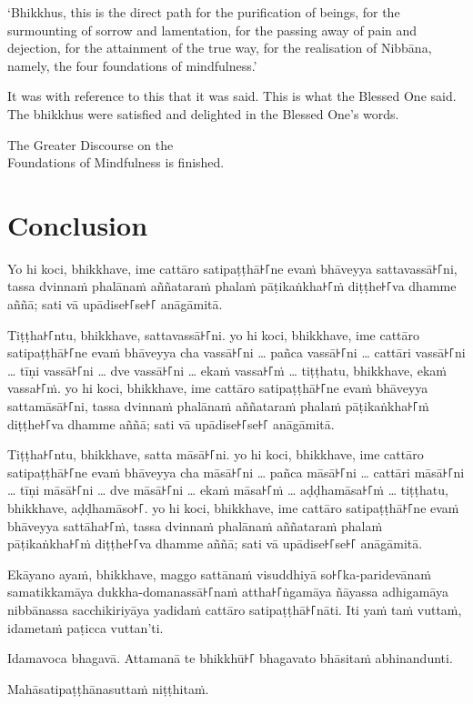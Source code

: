 `Bhikkhus, this is the direct path for the purification of beings, for the
surmounting of sorrow and lamentation, for the passing away of pain and
dejection, for the attainment of the true way, for the realisation of Nibbāna,
namely, the four foundations of mindfulness.'

It was with reference to this that it was said. This is what the Blessed One
said. The bhikkhus were satisfied and delighted in the Blessed One's words.

\bigskip

{\centering\instructionFont\color{instruction}\upshape

  The Greater Discourse on the\\
  Foundations of Mindfulness is finished.

}

\paliPage
\chapter*{Conclusion}

Yo hi koci, bhikkhave, ime cattāro satipaṭṭhā꜔꜒ne evaṁ bhāveyya sattavassā꜔꜒ni,
tassa dvinnaṁ phalānaṁ aññataraṁ phalaṁ pāṭikaṅkha꜔꜒ṁ diṭṭhe꜔꜒va dhamme aññā; sati
vā upādise꜔꜒se꜔꜒ anāgāmitā.

Tiṭṭha꜔꜒ntu, bhikkhave, sattavassā꜔꜒ni. yo hi koci, bhikkhave, ime cattāro
satipaṭṭhā꜔꜒ne evaṁ bhāveyya cha vassā꜔꜒ni \ldots{} pañca vassā꜔꜒ni
\ldots{} cattāri vassā꜔꜒ni \ldots{} tīṇi vassā꜔꜒ni \ldots{} dve vassā꜔꜒ni \ldots{}
ekaṁ vassa꜔꜒ṁ \ldots{} tiṭṭhatu, bhikkhave, ekaṁ vassa꜔꜒ṁ. yo hi koci, bhikkhave,
ime cattāro satipaṭṭhā꜔꜒ne evaṁ bhāveyya sattamāsā꜔꜒ni, tassa dvinnaṁ phalānaṁ
aññataraṁ phalaṁ pāṭikaṅkha꜔꜒ṁ diṭṭhe꜔꜒va dhamme aññā; sati vā upādise꜔꜒se꜔꜒ anāgāmitā.

Tiṭṭha꜔꜒ntu, bhikkhave, satta māsā꜔꜒ni. yo hi koci, bhikkhave, ime cattāro
satipaṭṭhā꜔꜒ne evaṁ bhāveyya cha māsā꜔꜒ni \ldots{} pañca māsā꜔꜒ni \ldots{}
cattāri māsā꜔꜒ni \ldots{} tīṇi māsā꜔꜒ni \ldots{} dve māsā꜔꜒ni \ldots{} ekaṁ māsa꜔꜒ṁ
\ldots{} aḍḍhamāsa꜔꜒ṁ \ldots{} tiṭṭhatu, bhikkhave, aḍḍhamāso꜔꜒. yo hi koci,
bhikkhave, ime cattāro satipaṭṭhā꜔꜒ne evaṁ bhāveyya sattāha꜔꜒ṁ, tassa dvinnaṁ
phalānaṁ aññataraṁ phalaṁ pāṭikaṅkha꜔꜒ṁ diṭṭhe꜔꜒va dhamme aññā; sati vā upādise꜔꜒se꜔꜒
anāgāmitā.

Ekāyano ayaṁ, bhikkhave, maggo sattānaṁ visuddhiyā so꜔꜒ka-paridevānaṁ samatikkamāya
dukkha-domanassā꜔꜒naṁ attha꜔꜒ṅgamāya ñāyassa adhigamāya nibbānassa sacchikiriyāya
yadidaṁ cattāro satipaṭṭhā꜔꜒nāti. Iti yaṁ taṁ vuttaṁ, idametaṁ paṭicca vuttan'ti.

Idamavoca bhagavā. Attamanā te bhikkhū꜔꜒ bhagavato bhāsitaṁ abhinandunti.

\bigskip

{\centering\instructionFont\color{instruction}\upshape

  Mahāsatipaṭṭhānasuttaṁ niṭṭhitaṁ.

}

\resumeNormalText
